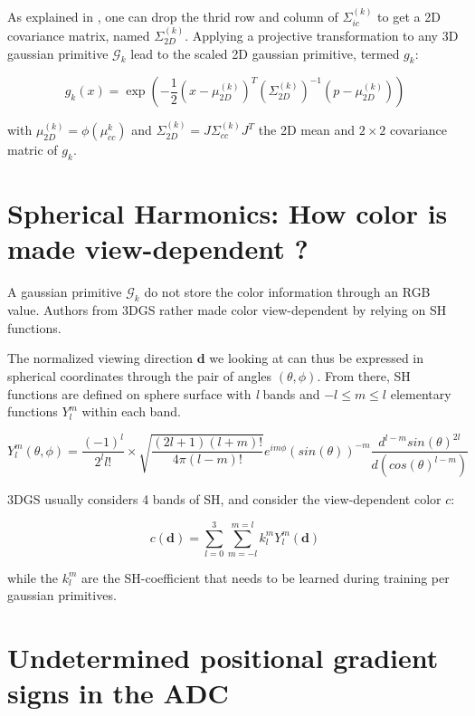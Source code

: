 As explained in \citep{zwicker2001ewa}, one can drop the thrid row and column of  $\Sigma^{(k)}_{ic}$ to get a 2D covariance matrix, named $\Sigma^{(k)}_{2D}$. Applying a projective transformation to any 3D gaussian primitive $\mathcal{G}_{k}$ lead to the scaled 2D gaussian primitive, termed $g_{k}$: 

\begin{equation}
    g_{k}(x) = \exp(-\frac{1}{2}(x-\mu^{(k)}_{2D})^{T}(\Sigma^{(k)}_{2D})^{-1}(p-\mu^{(k)}_{2D}))
\end{equation}

with $\mu^{(k)}_{2D}= \phi(\mu_{cc}^{k})$ and $\Sigma^{(k)}_{2D}= J\Sigma^{(k)}_{cc}J^{T}$ the 2D mean and $2\times2$ covariance matric of $ g_{k}$. 


\section{Spherical Harmonics: How color is made view-dependent ?}
\label{appendix:gs-sh}

A gaussian primitive $\mathcal{G}_{k}$ do not store the color information through an RGB value. Authors from 3D\ac{GS} rather made color view-dependent by relying on \ac{SH} functions. 

The normalized viewing direction $\mathbf{d}$ we looking at can thus be expressed in spherical coordinates through the pair of angles $(\theta,\phi)$. From there, \ac{SH} functions are defined on sphere surface with \textit{l} bands and $-l \leq  m \leq l$ elementary functions $Y_{l}^{m}$ within each band.

\begin{equation}
    Y_{l}^{m}(\theta,\phi) = \frac{(-1)^{l}}{2^{l}l!} \times \sqrt{\frac{(2l+1)(l+m)!}{4\pi(l-m)!}}e^{im\phi}(sin(\theta))^{-m}\frac{d^{l-m}sin(\theta)^{2l}}{d(cos(\theta)^{l-m})}
\end{equation}

3D\ac{GS} usually considers 4 bands of \ac{SH}, and consider the view-dependent color $c$: 

\begin{equation}
    c(\mathbf{d}) = \sum_{l=0}^{3}\sum_{m=-l}^{m=l}k_{l}^{m}Y_{l}^{m}(\mathbf{d})
\end{equation}

while the $k_{l}^{m}$ are the \ac{SH}-coefficient that needs to be learned during training per gaussian primitives. 

\section{Undetermined positional gradient signs in the ADC}
\label{appendix:sign-gradient}

